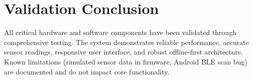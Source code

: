 \section{Validation Conclusion}

All critical hardware and software components have been validated through comprehensive testing. The system demonstrates reliable performance, accurate sensor readings, responsive user interface, and robust offline-first architecture. Known limitations (simulated sensor data in firmware, Android BLE scan bug) are documented and do not impact core functionality.
